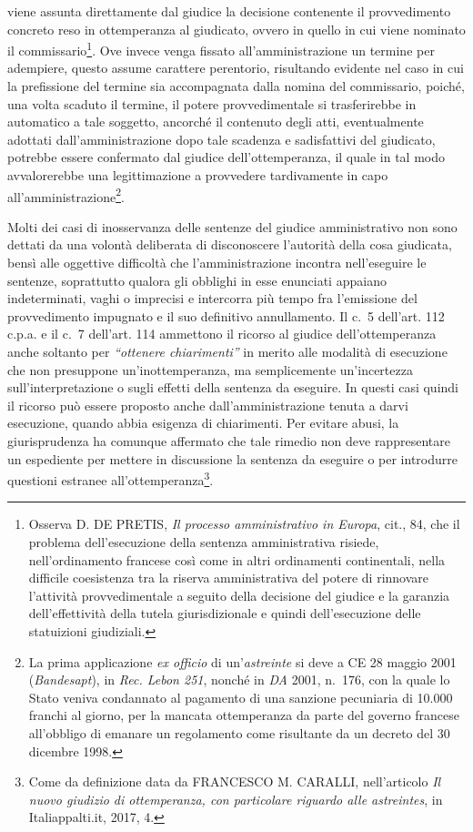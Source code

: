 \documentclass[12pt,it,a4paper,]{report}
\begin{document}
viene assunta direttamente dal giudice la decisione contenente il
provvedimento concreto reso in ottemperanza al giudicato, ovvero in
quello in cui viene nominato il commissario\footnote{Osserva D. DE
  PRETIS, \emph{Il processo amministrativo in Europa}, cit., 84, che il
  problema dell'esecuzione della sentenza amministrativa risiede,
  nell'ordinamento francese così come in altri ordinamenti continentali,
  nella difficile coesistenza tra la riserva amministrativa del potere
  di rinnovare l'attività provvedimentale a seguito della decisione del
  giudice e la garanzia dell'effettività della tutela giurisdizionale e
  quindi dell'esecuzione delle statuizioni giudiziali.}. Ove invece
venga fissato all'amministrazione un termine per adempiere, questo
assume carattere perentorio, risultando evidente nel caso in cui la
prefissione del termine sia accompagnata dalla nomina del commissario,
poiché, una volta scaduto il termine, il potere provvedimentale si
trasferirebbe in automatico a tale soggetto, ancorché il contenuto degli
atti, eventualmente adottati dall'amministrazione dopo tale scadenza e
sadisfattivi del giudicato, potrebbe essere confermato dal giudice
dell'ottemperanza, il quale in tal modo avvalorerebbe una legittimazione
a provvedere tardivamente in capo all'amministrazione\footnote{La prima
  applicazione \emph{ex officio} di un'\emph{astreinte} si deve a CE 28
  maggio 2001 (\emph{Bandesapt}), in \emph{Rec. Lebon 251}, nonché in
  \emph{DA} 2001, n.~176, con la quale lo Stato veniva condannato al
  pagamento di una sanzione pecuniaria di 10.000 franchi al giorno, per
  la mancata ottemperanza da parte del governo francese all'obbligo di
  emanare un regolamento come risultante da un decreto del 30 dicembre
  1998.}.

Molti dei casi di inosservanza delle sentenze del giudice amministrativo
non sono dettati da una volontà deliberata di disconoscere l'autorità
della cosa giudicata, bensì alle oggettive difficoltà che
l'amministrazione incontra nell'eseguire le sentenze, soprattutto
qualora gli obblighi in esse enunciati appaiano indeterminati, vaghi o
imprecisi e intercorra più tempo fra l'emissione del provvedimento
impugnato e il suo definitivo annullamento. Il c.~5 dell'art. 112 c.p.a.
e il c.~7 dell'art. 114 ammettono il ricorso al giudice
dell'ottemperanza anche soltanto per \emph{``ottenere chiarimenti''} in
merito alle modalità di esecuzione che non presuppone un'inottemperanza,
ma semplicemente un'incertezza sull'interpretazione o sugli effetti
della sentenza da eseguire. In questi casi quindi il ricorso può essere
proposto anche dall'amministrazione tenuta a darvi esecuzione, quando
abbia esigenza di chiarimenti. Per evitare abusi, la giurisprudenza ha
comunque affermato che tale rimedio non deve rappresentare un espediente
per mettere in discussione la sentenza da eseguire o per introdurre
questioni estranee all'ottemperanza\footnote{Come da definizione data da
  FRANCESCO M. CARALLI, nell'articolo \emph{Il nuovo giudizio di
  ottemperanza, con particolare riguardo alle astreintes}, in
  Italiappalti.it, 2017, 4.}.
\end{document}
